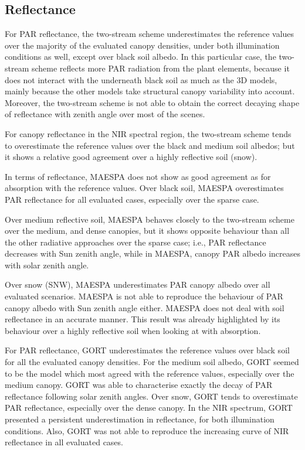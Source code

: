 \subsection{Reflectance}

For PAR reflectance, the two-stream scheme underestimates the reference values over the majority of the evaluated canopy densities, under both illumination conditions as well, except over black soil albedo. In this particular case, the two-stream scheme reflects more PAR radiation from the plant elements, because it does not interact with the underneath black soil as much as the 3D models, mainly because the other models take structural canopy variability into account. Moreover, the two-stream scheme is not able to obtain the correct decaying shape of reflectance with zenith angle over most of the scenes.

For canopy reflectance in the NIR spectral region, the two-stream scheme tends to overestimate the reference values over the black and medium soil albedos; but it shows a relative good agreement over a highly reflective soil (snow).

In terms of reflectance, MAESPA does not show as good agreement as for absorption with the reference values. Over black soil, MAESPA overestimates PAR reflectance for all evaluated cases, especially over the sparse case.

Over medium reflective soil, MAESPA behaves closely to the two-stream scheme over the medium, and dense canopies, but it shows opposite behaviour than all the other radiative approaches over the sparse case; i.e., PAR reflectance decreases with Sun zenith angle, while in MAESPA, canopy PAR albedo increases with solar zenith angle. 

Over snow (SNW), MAESPA underestimates PAR canopy albedo over all evaluated scenarios. MAESPA is not able to reproduce the behaviour of PAR canopy albedo with Sun zenith angle either. MAESPA does not deal with soil reflectance in an accurate manner. This result was already highlighted by its behaviour over a highly reflective soil when looking at with absorption. 

For PAR reflectance, GORT underestimates the reference values over black soil for all the evaluated canopy densities. For the medium soil albedo, GORT seemed to be the model which most agreed with the reference values, especially over the medium canopy. GORT was able to characterise exactly the decay of PAR reflectance following solar zenith angles. Over snow, GORT tends to overestimate PAR reflectance, especially over the dense canopy. In the NIR spectrum, GORT presented a persistent underestimation in reflectance, for both illumination conditions. Also, GORT was not able to reproduce the increasing curve of NIR reflectance in all evaluated cases.

